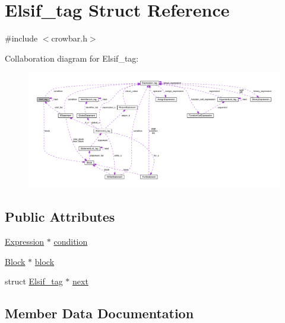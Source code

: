 \hypertarget{struct_elsif__tag}{}\section{Elsif\+\_\+tag Struct Reference}
\label{struct_elsif__tag}


{\ttfamily \#include $<$crowbar.\+h$>$}



Collaboration diagram for Elsif\+\_\+tag\+:\nopagebreak
\begin{figure}[H]
\begin{center}
\leavevmode
\includegraphics[width=350pt]{struct_elsif__tag__coll__graph}
\end{center}
\end{figure}
\subsection*{Public Attributes}
\begin{DoxyCompactItemize}
\item 
\hyperlink{crowbar_8h_a070c6feb370aad8a9665ca315bf6ed4a}{Expression} $\ast$ \hyperlink{struct_elsif__tag_a90add539e16a341fa17d195711585561}{condition}
\item 
\hyperlink{struct_block}{Block} $\ast$ \hyperlink{struct_elsif__tag_a9194a341db2b2733748ce1d7b9ad6dd9}{block}
\item 
struct \hyperlink{struct_elsif__tag}{Elsif\+\_\+tag} $\ast$ \hyperlink{struct_elsif__tag_a8a3bbc2610b58f08517837ee97da2549}{next}
\end{DoxyCompactItemize}


\subsection{Member Data Documentation}
\hypertarget{struct_elsif__tag_a9194a341db2b2733748ce1d7b9ad6dd9}{}
